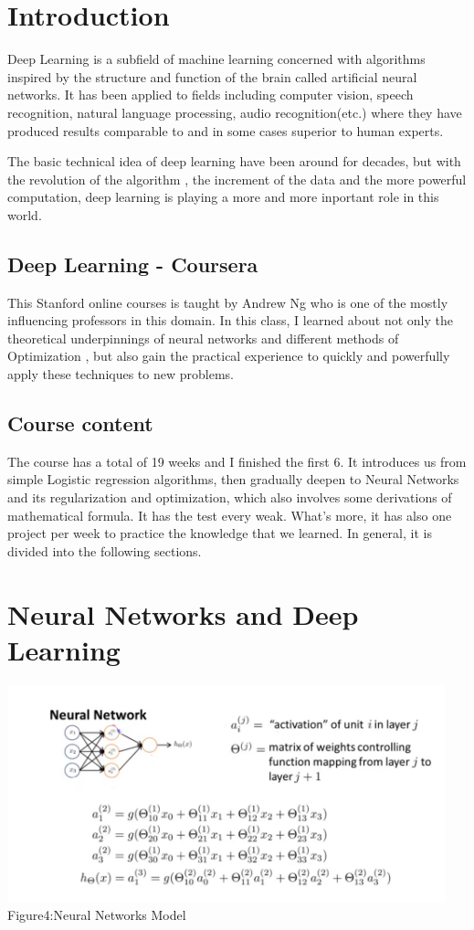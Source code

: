 \documentclass[a4paper]{article}
\begin{document}
\section{Introduction}
\Large{

	 Deep Learning is a subfield of machine learning concerned with algorithms inspired by the structure and function of the brain called artificial neural networks. It has been applied to fields including computer vision, speech recognition, natural language processing, audio recognition(etc.) where they have produced results comparable to and in some cases superior to human experts.

	 The basic technical idea of deep learning have been around for decades, but with the revolution of the algorithm , the increment of the data and the more powerful computation, deep learning is playing a more and more inportant role in this world.
\subsection{Deep Learning - Coursera}

This Stanford online courses is taught by Andrew Ng who is one of the mostly influencing professors in this domain. In this class, I learned about not only the theoretical underpinnings of neural networks and different methods of Optimization
, but also gain the practical experience to quickly and powerfully apply these techniques to new problems. 


\subsection{Course content}

The course has a total of 19 weeks and I finished the first 6. It introduces us from simple Logistic regression algorithms, then gradually deepen to Neural Networks and its regularization and optimization, which also involves some derivations of mathematical formula. It has the test every weak. What's more, it has also one project per week to practice the knowledge that we learned. In general, it is divided into the following sections.
}
\section{Neural Networks and Deep Learning}
\begin{center}
\includegraphics[width=5in]{nn.png}\\
Figure4:Neural Networks Model
\end{center}
\end{document}
